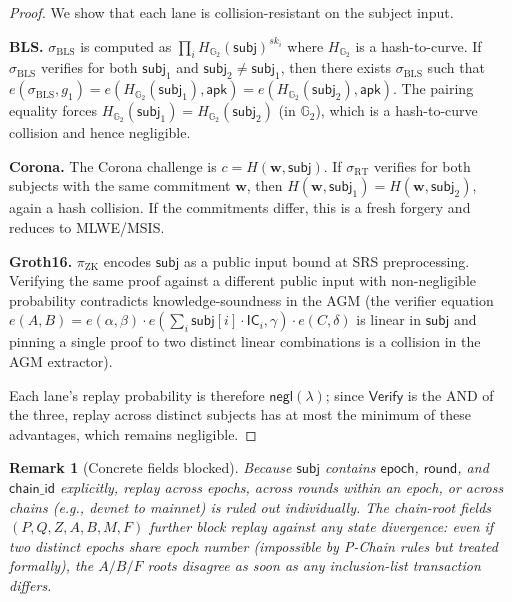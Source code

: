 \documentclass[11pt]{article}
\newtheorem{remark}{Remark}
\begin{document}
\begin{proof}
We show that each lane is collision-resistant on the subject input.

\medskip\noindent
\textbf{BLS.}  $\sigma_{\mathrm{BLS}}$ is computed as
$\prod_i H_{\mathbb{G}_2}(\mathsf{subj})^{sk_i}$ where
$H_{\mathbb{G}_2}$ is a hash-to-curve.  If
$\sigma_{\mathrm{BLS}}$ verifies for both $\mathsf{subj}_1$ and
$\mathsf{subj}_2 \neq \mathsf{subj}_1$, then there exists
$\sigma_{\mathrm{BLS}}$ such that
$e(\sigma_{\mathrm{BLS}}, g_1) = e(H_{\mathbb{G}_2}(\mathsf{subj}_1),
\mathsf{apk}) = e(H_{\mathbb{G}_2}(\mathsf{subj}_2), \mathsf{apk})$.
The pairing equality forces
$H_{\mathbb{G}_2}(\mathsf{subj}_1) = H_{\mathbb{G}_2}(\mathsf{subj}_2)$
(in $\mathbb{G}_2$), which is a hash-to-curve collision and hence
negligible.

\medskip\noindent
\textbf{Corona.}  The Corona challenge is
$c = H(\mathbf{w}, \mathsf{subj})$.  If $\sigma_{\mathrm{RT}}$ verifies
for both subjects with the same commitment $\mathbf{w}$, then
$H(\mathbf{w}, \mathsf{subj}_1) = H(\mathbf{w}, \mathsf{subj}_2)$,
again a hash collision.  If the commitments differ, this is a fresh
forgery and reduces to MLWE/MSIS.

\medskip\noindent
\textbf{Groth16.}  $\pi_{\mathrm{ZK}}$ encodes $\mathsf{subj}$ as a
public input bound at SRS preprocessing.  Verifying the same proof
against a different public input with non-negligible probability
contradicts knowledge-soundness in the AGM (the verifier equation
$e(A, B) = e(\alpha, \beta) \cdot e(\sum_i \mathsf{subj}[i] \cdot
\mathsf{IC}_i, \gamma) \cdot e(C, \delta)$ is linear in
$\mathsf{subj}$ and pinning a single proof to two distinct linear
combinations is a collision in the AGM extractor).

\medskip\noindent
Each lane's replay probability is therefore $\mathsf{negl}(\lambda)$;
since $\mathsf{Verify}$ is the AND of the three, replay across
distinct subjects has at most the minimum of these advantages, which
remains negligible.
\end{proof}

\begin{remark}[Concrete fields blocked]
Because $\mathsf{subj}$ contains $\mathsf{epoch}$, $\mathsf{round}$,
and $\mathsf{chain\_id}$ explicitly, replay across epochs, across
rounds within an epoch, or across chains (e.g., devnet to mainnet) is
ruled out individually.  The chain-root fields
$(P, Q, Z, A, B, M, F)$ further block replay against any state
divergence: even if two distinct epochs share epoch number (impossible
by P-Chain rules but treated formally), the $A/B/F$ roots disagree as
soon as any inclusion-list transaction differs.
\end{remark}
\end{document}
